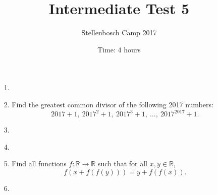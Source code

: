 \documentclass[12pt]{article}
\title{Intermediate Test 5}
\author{Stellenbosch Camp 2017}
\date{Time: 4 hours}
\begin{document}
 \maketitle

\begin{enumerate}

\item[1.] %


\item[2.] %
Find the greatest common divisor of the following 2017 numbers:
  \[ 2017+1,\ 2017^2+1,\ 2017^3+1,\ \dotsc,\ 2017^{2017}+1. \]


\item[3.] %


\item[4.] %
 

\item[5.] %
Find all functions $f: \mathbb{R} \to \mathbb{R}$ such that for all $x,y \in \mathbb{R}$,
  \[ f(x+f(f(y))) = y+f(f(x)). \]


\item[6.] %


\end{enumerate}

\vfill

\centering
\begin{BVerbatim}
\end{BVerbatim}
\end{document}
